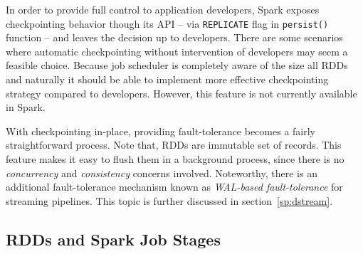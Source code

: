 In order to provide full control to application developers, Spark exposes checkpointing behavior though its API -- via \lstinline$REPLICATE$ flag in \lstinline$persist()$ function -- and leaves the decision up to developers. There are some scenarios where automatic checkpointing without intervention of developers may seem a feasible choice. Because job scheduler is completely aware of the size all RDDs and naturally it should be able to implement more effective checkpointing strategy compared to developers. However, this feature is not currently available in Spark.

With checkpointing in-place, providing fault-tolerance becomes a fairly straightforward process. Note that, RDDs are immutable set of records. This feature makes it easy to flush them in a background process, since there is no \emph{concurrency} and \emph{consistency} concerns involved. Noteworthy, there is an additional fault-tolerance mechanism known as \emph{WAL-based fault-tolerance} for streaming pipelines. This topic is further discussed in section~\ref{sp:dstream}.

\clearpage
\subsection{RDDs and Spark Job Stages}
\label{sp:stage}

